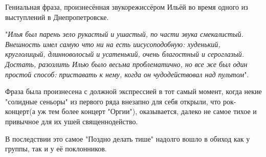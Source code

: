 Гениальная фраза, произнесённая звукорежиссёром Ильёй во время одного из выступлений в Днепропетровске.

"\emph{Илья был парень зело рукастый и ушастый, по части звука смекалистый. Внешность имел самую что ни на есть иисусоподобную: худенький, круглолицый, длинноволосый и усатенький, очень благостный и сероглазый. Достать, разозлить Илью было весьма проблематично, но все же был один простой способ: приставать к нему, когда он чудодействовал над пультом}".

Фраза была произнесена с должной экспрессией в тот самый момент, когда некие "солидные сеньоры" из первого ряда внезапно для себя открыли, что рок-концерт(а уж тем более концерт "Оргии"), оказывается, далеко не самое тихое и привычное для их ушей священнодейство. 

В последствии это самое "Поздно делать тише" надолго вошло в обиход как у группы, так и у её поклонников. 
